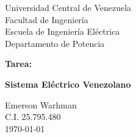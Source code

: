 \begin{titlepage}
    \centering
    \Large
    Universidad Central de Venezuela\\
    Facultad de Ingeniería\\
    Escuela de Ingeniería Eléctrica\\
    Departamento de Potencia
    \vspace*{8cm}

    \Huge
    \textbf{Tarea:}

    \textbf{Sistema Eléctrico Venezolano}
    \vfill

    \Large

    Emerson Warhman \\
    C.I. 25.795.480 \\
    \today

\end{titlepage}
